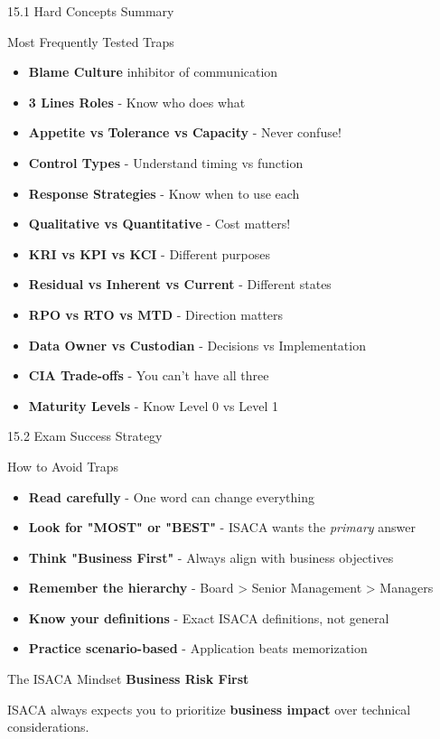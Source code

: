 \documentclass{beamer}
\begin{document}
	\begin{frame}{15.1 Hard Concepts Summary}
		\begin{block}{Most Frequently Tested Traps}
			\begin{itemize}
				\item \textbf{Blame Culture} inhibitor of communication
				\item \textbf{3 Lines Roles} - Know who does what
				\item \textbf{Appetite vs Tolerance vs Capacity} - Never confuse!
				\item \textbf{Control Types} - Understand timing vs function
				\item \textbf{Response Strategies} - Know when to use each
				\item \textbf{Qualitative vs Quantitative} - Cost matters!
				\item \textbf{KRI vs KPI vs KCI} - Different purposes
				\item \textbf{Residual vs Inherent vs Current} - Different states
				\item \textbf{RPO vs RTO vs MTD} - Direction matters
				\item \textbf{Data Owner vs Custodian} - Decisions vs Implementation
				\item \textbf{CIA Trade-offs} - You can't have all three
				\item \textbf{Maturity Levels} - Know Level 0 vs Level 1
			\end{itemize}
		\end{block}
	\end{frame}
	
	\begin{frame}{15.2 Exam Success Strategy}
		\begin{block}{How to Avoid Traps}
			\begin{itemize}
				\item \textbf{Read carefully} - One word can change everything
				\item \textbf{Look for "MOST" or "BEST"} - ISACA wants the \textit{primary} answer
				\item \textbf{Think "Business First"} - Always align with business objectives
				\item \textbf{Remember the hierarchy} - Board > Senior Management > Managers
				\item \textbf{Know your definitions} - Exact ISACA definitions, not general
				\item \textbf{Practice scenario-based} - Application beats memorization
			\end{itemize}
		\end{block}
		
		\begin{exampleblock}{The ISACA Mindset}
			\centering
			\Large{\textbf{Business Risk First}}
			
			\normalsize{ISACA always expects you to prioritize \textbf{business impact} over technical considerations.}
		\end{exampleblock}
	\end{frame}
	
\end{document}
